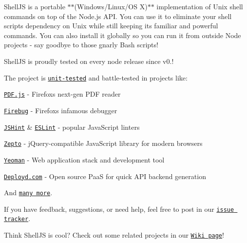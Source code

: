 \href{https://gitter.im/shelljs/shelljs?utm_source=badge&utm_medium=badge&utm_campaign=pr-badge&utm_content=badge}{\tt } \href{https://travis-ci.org/shelljs/shelljs}{\tt } \href{https://ci.appveyor.com/project/shelljs/shelljs/branch/master}{\tt } \href{https://codecov.io/gh/shelljs/shelljs}{\tt } \href{https://www.npmjs.com/package/shelljs}{\tt } \href{https://www.npmjs.com/package/shelljs}{\tt }

Shell\+JS is a portable $\ast$$\ast$(Windows/\+Linux/\+OS X)$\ast$$\ast$ implementation of Unix shell commands on top of the Node.\+js A\+PI. You can use it to eliminate your shell script\textquotesingle{}s dependency on Unix while still keeping its familiar and powerful commands. You can also install it globally so you can run it from outside Node projects -\/ say goodbye to those gnarly Bash scripts!

Shell\+JS is proudly tested on every node release since {\ttfamily v0.}!

The project is \href{http://travis-ci.org/shelljs/shelljs}{\tt unit-\/tested} and battle-\/tested in projects like\+:


\begin{DoxyItemize}
\item \href{http://github.com/mozilla/pdf.js}{\tt P\+D\+F.\+js} -\/ Firefox\textquotesingle{}s next-\/gen P\+DF reader
\item \href{http://getfirebug.com/}{\tt Firebug} -\/ Firefox\textquotesingle{}s infamous debugger
\item \href{http://jshint.com}{\tt J\+S\+Hint} \& \href{http://eslint.org/}{\tt E\+S\+Lint} -\/ popular Java\+Script linters
\item \href{http://zeptojs.com}{\tt Zepto} -\/ j\+Query-\/compatible Java\+Script library for modern browsers
\item \href{http://yeoman.io/}{\tt Yeoman} -\/ Web application stack and development tool
\item \href{http://deployd.com}{\tt Deployd.\+com} -\/ Open source PaaS for quick A\+PI backend generation
\item And \href{https://npmjs.org/browse/depended/shelljs}{\tt many more}.
\end{DoxyItemize}

If you have feedback, suggestions, or need help, feel free to post in our \href{https://github.com/shelljs/shelljs/issues}{\tt issue tracker}.

Think Shell\+JS is cool? Check out some related projects in our \href{https://github.com/shelljs/shelljs/wiki}{\tt Wiki page}!

